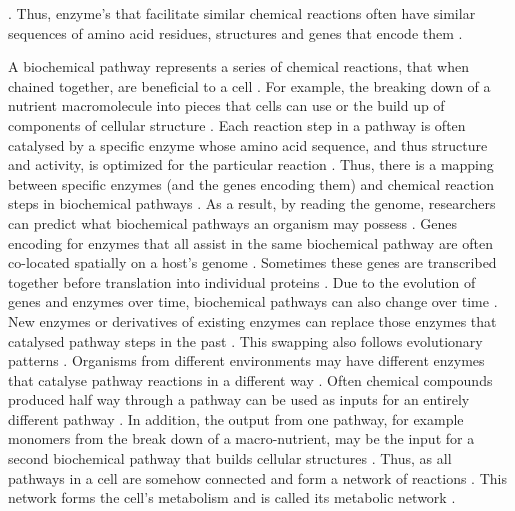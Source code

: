 \cite{zhang2003evolution,whelan2001general}. Thus, enzyme's that facilitate similar chemical reactions often \cite{galperin1998analogous} have similar sequences of amino acid residues, structures and genes that encode them \cite{zhang2003evolution}.

A biochemical pathway represents a series of chemical reactions, that when chained together, are beneficial to a cell \cite{michal2012biochemical}. For example, the breaking down of a nutrient macromolecule into pieces that cells can use or the build up of components of cellular structure \cite{wagner2012metabolic}. Each reaction step in a pathway is often \cite{keller2015widespread,tawfik2010enzyme} catalysed by a specific enzyme whose amino acid sequence, and thus structure and activity, is optimized for the particular reaction \cite{michal2012biochemical,zhang2003evolution,fersht1999structure}. Thus, there is a mapping between specific enzymes (and the genes encoding them) and chemical reaction steps in biochemical pathways \cite{thiele2010protocol}. As a result, by reading the genome, researchers can predict what biochemical pathways an organism may possess \cite{abubucker2012metabolic,thiele2010protocol}. Genes encoding for enzymes that all assist in the same biochemical pathway are often co-located spatially on a host's genome \cite{lawrence1999selfish,de2010genomic}. Sometimes these genes are transcribed together before translation into individual proteins \cite{blumenthal1998gene,danchin1980coordinate}. Due to the evolution of genes and enzymes over time, biochemical pathways can also change over time \cite{hochachka2002biochemical,raymond2006effect}. New enzymes or derivatives of existing enzymes can replace those enzymes that catalysed pathway steps in the past \cite{jensen1976enzyme}. This swapping also follows evolutionary patterns \cite{morowitz1999theory, raymond2006effect,wagner2012metabolic}. Organisms from different environments may have different enzymes that catalyse pathway reactions in a different way \cite{raymond2006effect}. Often chemical compounds produced half way through a pathway can be used as inputs for an entirely different pathway \cite{wagner2012metabolic,stelling2002metabolic}. In addition, the output from one pathway, for example monomers from the break down of a macro-nutrient, may be the input for a second biochemical pathway that builds cellular structures \cite{wagner2012metabolic,stelling2002metabolic}. Thus, as all pathways in a cell are somehow connected and form a network of reactions \cite{wagner2012metabolic,stelling2002metabolic}. This network forms the cell's metabolism and is called its metabolic network \cite{wagner2012metabolic}.

